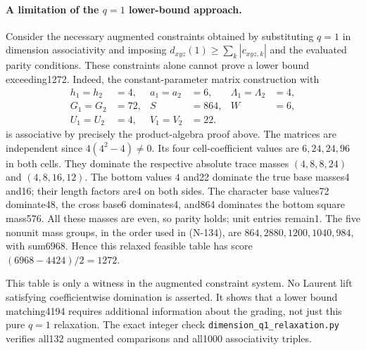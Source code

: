 \paragraph{A limitation of the $q=1$ lower-bound approach.}
Consider the necessary augmented constraints obtained by substituting
$q=1$ in dimension associativity and imposing
$d_{xyz}(1)\ge\sum_k|c_{xyz,k}|$ and the evaluated parity conditions.
These constraints alone cannot prove a lower bound exceeding1272.
Indeed, the constant-parameter matrix construction with
\[
 \begin{aligned}
 h_1=h_2&=4,& a_1=a_2&=6,& \Lambda_1=\Lambda_2&=4,\\
 G_1=G_2&=72,& S&=864,& W&=6,\\
 U_1=U_2&=4,& V_1=V_2&=22.
 \end{aligned}
 \tag{N-139}
\]
is associative by precisely the product-algebra proof above.
The matrices are independent since $4(4^2-4)\ne0$.
Its four cell-coefficient values are $6,24,24,96$ in both cells.
They dominate the respective absolute trace masses
$(4,8,8,24)$ and $(4,8,16,12)$.
The bottom values $4$ and22 dominate the true base masses4 and16;
their length factors are4 on both sides.  The character base values72
dominate48, the cross base6 dominates4, and864 dominates the bottom
square mass576.  All these masses are even, so parity holds; unit
entries remain1.  The five nonunit mass groups, in the order used in
(N-134), are $864,2880,1200,1040,984$, with sum6968.  Hence this
relaxed feasible table has score $(6968-4424)/2=1272$.

This table is only a witness in the augmented constraint system.
No Laurent lift satisfying coefficientwise domination is asserted.
It shows that a lower bound matching4194 requires additional
information about the grading, not just this pure $q=1$ relaxation.
The exact integer check \nolinkurl{dimension_q1_relaxation.py} verifies
all132 augmented comparisons and all1000 associativity triples.
